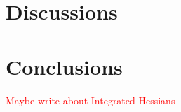\documentclass[12pt]{report}
\begin{document}
\chapter{Discussions} 

\chapter{Conclusions} 

\textcolor{red}{Maybe write about Integrated Hessians}	 \cite{DBLP:journals/corr/abs-2002-04138}

















\newpage

%




	

\printbibliography
\end{document}
